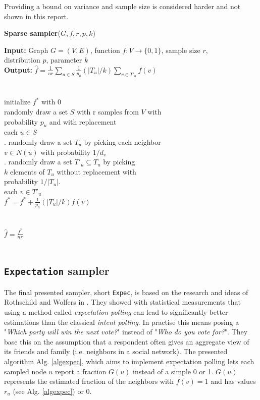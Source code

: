 Providing a bound on variance and sample size is considered harder and not shown in this report.
\begin{algorithm*}[!htb]
\caption{\small {\bf Sparse sampler}($G, f, r, p, k$)}
\begin{code}
{\bf Input:} Graph $G=(V,E)$, function $f : V \rightarrow \{0,1\}$, sample size $r$,\\ distribution $p$, parameter $k$ \\
{\bf Output:} $\hat{f}=\frac{1}{nr}\sum\nolimits_{u\in S}\frac{1}{p_u}(|T_u|/k)\sum\nolimits_{v\in T'_u} f(v)$\\
\\
\uln \>\ubegin\\
\uln \>\>initialize $f^*$ with 0 \\
\uln \>\>randomly draw a set $S$ with r samples from $V$ with\\
\>   \>\>\>probability $p_u$ and with replacement\\
\uln \>\>\ufor each $u \in S$ \udo\\
\uln \>\>. randomly draw a set $T_u$ by picking each neighbor\\
\>   \>\>\>\> $v \in N(u)$ with probability $1/d_v$ \\
\uln \>\>. randomly draw a set $T'_u \subseteq T_u$ by picking\\
\>   \>\>\>\> $k$ elements of $T_u$ without replacement with\\
\>   \>\>\>\> probability $1/|T_u|$.\\
\uln \>\>\>\ufor each $v \in T'_u$ \udo\\
\uln \>\>\>\>$f^* = f^* + \frac{1}{p_u}(|T_u|/k)f(v)$ \\
\uln \>\>\>\uend\\
\uln \>\>\uend\\
\uln \>\ureturn $\hat{f} = \frac{f^*}{nr}$ \\
\uln \>\uend\\ 
\end{code}
\label{algsparse}
\end{algorithm*}
\subsection{\texttt{Expectation} sampler}
The final presented sampler, short \texttt{Expec}, is based on the research and ideas of Rothschild and Wolfers in \cite{rothschild2009forecasting}. They showed with statistical measurements that using a method called \textit{expectation polling} can lead to significantly better estimations than the classical \textit{intent polling}.
In practise this means posing a "\textit{Which party will win the next vote?}" instead of "\textit{Who do you vote for?}".
They base this on the assumption that a respondent often gives an aggregate view of its friends and family (i.e. neighbors in a social network).
The presented algorithm Alg. \ref{algexpec}, which aims to implement expectation polling lets each sampled node $u$ report a fraction $G(u)$ instead of a simple 0 or 1. $G(u)$ represents the estimated fraction of the neighbors with $f(v) = 1$ and has values $r_u$ (see Alg. \ref{algexpec}) or $0$.

